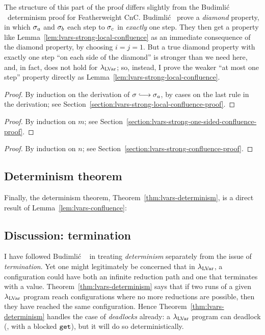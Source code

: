 The structure of this part of the proof differs slightly from the
Budimli\'c \etal~determinism proof for Featherweight CnC.  Budimli\'c
\etal~prove a \emph{diamond} property, in which $\sigma_a$ and
$\sigma_b$ each step to $\sigma_c$ in \emph{exactly} one step.  They
then get a property like Lemma~\ref{lem:lvars-strong-local-confluence}
as an immediate consequence of the diamond property, by choosing $i =
j = 1$.  But a true diamond property with exactly one step ``on each
side of the diamond'' is stronger than we need here, and, in fact,
does not hold for $\lambda_{\textrm{LVar}}$; so, instead, I prove the weaker ``at
most one step'' property directly as
Lemma~\ref{lem:lvars-strong-local-confluence}.

\LVarsLemStrongLocalConfluence
\begin{proof}
  By induction on the derivation of $\conf \parstepsto \conf_a$, by
  cases on the last rule in the derivation; see
  Section~\ref{section:lvars-strong-local-confluence-proof}.
\end{proof}

\LVarsLemStrongOneSidedConfluence
\begin{proof}
  By induction on $m$; see
  Section~\ref{section:lvars-strong-one-sided-confluence-proof}.
\end{proof}

\LVarsLemStrongConfluence
\begin{proof}
  By induction on $n$; see
  Section~\ref{section:lvars-strong-confluence-proof}.
\end{proof}

\LVarsLemConfluence

\subsection{Determinism theorem}

Finally, the determinism theorem, Theorem~\ref{thm:lvars-determinism},
is a direct result of Lemma~\ref{lem:lvars-confluence}:

\LVarsThmDeterminism

\subsection{Discussion: termination}

I have followed Budimli\'c \etal~\cite{CnC} in treating
\emph{determinism} separately from the issue of \emph{termination}.
Yet one might legitimately be concerned that in $\lambda_{\textrm{LVar}}$, a
configuration could have both an infinite reduction path and one that
terminates with a value.  Theorem~\ref{thm:lvars-determinism} says
that if two runs of a given $\lambda_{\textrm{LVar}}$ program reach configurations
where no more reductions are possible, then they have reached the same
configuration.  Hence Theorem~\ref{thm:lvars-determinism} handles the
case of \emph{deadlocks} already: a $\lambda_{\textrm{LVar}}$ program can deadlock
(\eg, with a blocked $\mbox{\texttt{get}}$), but it will do so deterministically.

